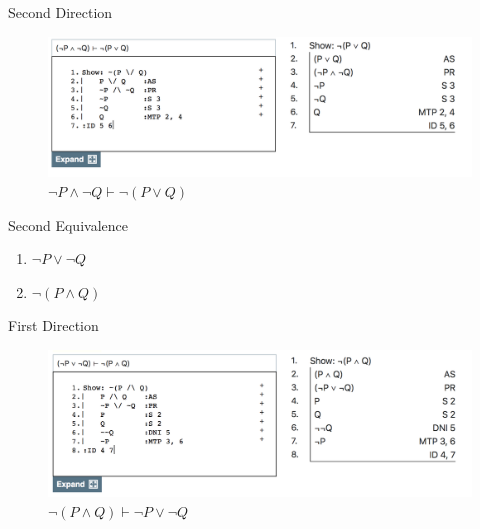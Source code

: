 \documentclass[
  ignorenonframetext,
]{beamer}
\providecommand{\tightlist}{%
  \setlength{\itemsep}{0pt}\setlength{\parskip}{0pt}}
\renewcommand{\,}{\text{, }}
\begin{document}
\begin{frame}{Second Direction}
\protect\hypertarget{second-direction}{}

\begin{figure}
\centering
\includegraphics{../images/class05/Class-05-8.png}
\caption{\(\neg P \wedge \neg Q \vdash \neg (P \vee Q)\)}
\end{figure}

\end{frame}

\begin{frame}{Second Equivalence}
\protect\hypertarget{second-equivalence}{}

\begin{enumerate}
\tightlist
\item
  \(\neg P \vee \neg Q\)
\item
  \(\neg (P \wedge Q)\)
\end{enumerate}

\end{frame}

\begin{frame}{First Direction}
\protect\hypertarget{first-direction-1}{}

\begin{figure}
\centering
\includegraphics{../images/class05/Class-05-9.png}
\caption{\(\neg (P \wedge Q) \vdash \neg P \vee \neg Q\)}
\end{figure}

\end{frame}
\end{document}
